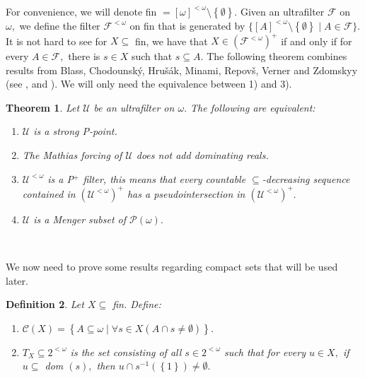 \documentclass{article}%
\newtheorem{theorem}{Theorem}
\newtheorem{definition}[theorem]{Definition}
\begin{document}
\qquad\ \ 

For convenience, we will denote \textsf{fin }$=\left[  \omega\right]
^{<\omega}\setminus\left\{  \emptyset\right\}  .$ Given an ultrafilter
$\mathcal{F}$ on $\omega,$ we define the filter $\mathcal{F}^{<\omega}$ on
\textsf{fin }that is generated by $\{\left[  A\right]  ^{<\omega}%
\setminus\left\{  \emptyset\right\}  \mid A\in\mathcal{F}\}.$ It is not hard
to see for $X\subseteq$ \textsf{fin, }we have that $X\in\left(  \mathcal{F}%
^{<\omega}\right)  ^{+}$ if and only if for every $A\in\mathcal{F},$ there is
$s\in X$ such that $s\subseteq A.$ The following theorem combines results from
Blass, Chodounsk\'{y}, Hru\v{s}\'{a}k, Minami, Repov\v{s}\textsf{, }Verner and
Zdomskyy (see \cite{HrusakVerner},
\cite{MathiasPrikryandLaverPrikryTypeForcing} and
\cite{MathiasForcingandCombinatorialCoveringPropertiesofFilters}). We will
only need the equivalence between 1) and 3).

\begin{theorem}
Let $\mathcal{U}$ be an ultrafilter on $\omega.$ The following are equivalent:
\label{Equivalencias strong ppoint}

\begin{enumerate}
\item $\mathcal{U}$ is a strong \textsf{P}-point.

\item The Mathias forcing of $\mathcal{U}$ does not add dominating reals.

\item $\mathcal{U}^{<\omega}$ is a \textsf{P}$^{+}$ filter, this means that
every countable $\subseteq$-decreasing sequence contained in $\left(
\mathcal{U}^{<\omega}\right)  ^{+}$ has a pseudointersection in $\left(
\mathcal{U}^{<\omega}\right)  ^{+}.$

\item $\mathcal{U}$ is a Menger subset of $\mathcal{P}\left(  \omega\right)
.$
\end{enumerate}
\end{theorem}

\qquad\ \ 

We now need to prove some results regarding compact sets that will be used later.

\begin{definition}
Let $X\subseteq$ \textsf{fin. }Define:

\begin{enumerate}
\item $\mathcal{C}\left(  X\right)  =\left\{  A\subseteq\omega\mid\forall s\in
X\left(  A\cap s\neq\emptyset\right)  \right\}  $.

\item $T_{X}\subseteq2^{<\omega}$ is the set consisting of all $s\in
2^{<\omega}$ such that for every $u\in X,$ if $u\subseteq$ \textsf{dom}%
$\left(  s\right)  ,$ then $u\cap s^{-1}\left(  \left\{  1\right\}  \right)
\neq\emptyset.$
\end{enumerate}
\end{definition}
\end{document}

